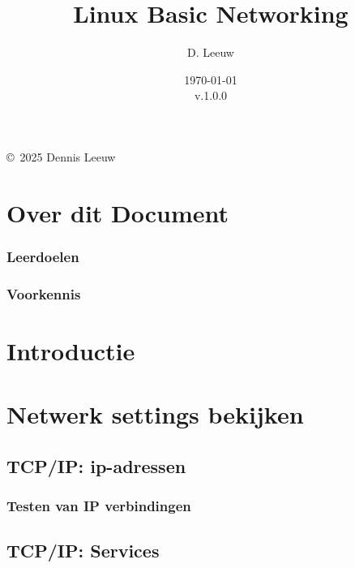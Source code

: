 \documentclass[a4paper,12pt,twoside,openright,titlepage]{book}
\author{D. Leeuw}
\title{Linux Basic Networking}
\date{\today\\v.1.0.0}
\begin{document}

\maketitle

\copyright\ 2025 Dennis Leeuw\\




\frontmatter
\chapter{Over dit Document}
\subsection{Leerdoelen}

\subsection{Voorkennis}



\tableofcontents

\mainmatter


\chapter{Introductie}


\chapter{Netwerk settings bekijken}

\section{TCP/IP: ip-adressen}

\subsection{Testen van IP verbindingen}


\section{TCP/IP: Services}
\end{document}
